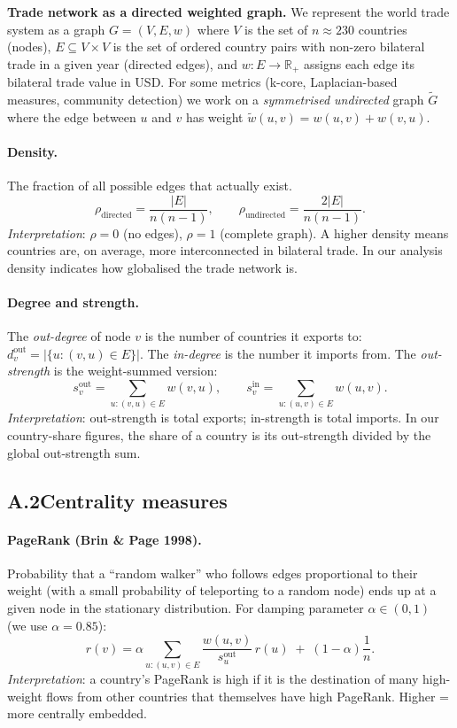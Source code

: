 \documentclass[11pt,a4paper]{article}
\begin{document}
\textbf{Trade network as a directed weighted graph.}
We represent the world trade system as a graph $G = (V, E, w)$ where
$V$ is the set of $n \approx 230$ countries (nodes), $E \subseteq V \times V$
is the set of ordered country pairs with non-zero bilateral trade in a given
year (directed edges), and $w: E \to \mathbb{R}_+$ assigns each edge its
bilateral trade value in USD.
For some metrics (k-core, Laplacian-based measures, community detection)
we work on a \emph{symmetrised undirected} graph $\tilde{G}$ where the
edge between $u$ and $v$ has weight
$\tilde{w}(u,v) = w(u,v) + w(v,u)$.

\paragraph{Density.}
The fraction of all possible edges that actually exist.
\[
\rho_{\text{directed}} = \frac{|E|}{n(n-1)},
\qquad
\rho_{\text{undirected}} = \frac{2|E|}{n(n-1)}.
\]
\emph{Interpretation}: $\rho = 0$ (no edges), $\rho = 1$ (complete graph).
A higher density means countries are, on average, more interconnected in
bilateral trade. In our analysis density indicates how globalised the trade
network is.

\paragraph{Degree and strength.}
The \emph{out-degree} of node $v$ is the number of countries it exports
to: $d_v^{\text{out}} = |\{u : (v,u) \in E\}|$. The \emph{in-degree} is
the number it imports from. The \emph{out-strength} is the
weight-summed version:
\[
s_v^{\text{out}} = \sum_{u : (v,u) \in E} w(v,u),
\qquad
s_v^{\text{in}} = \sum_{u : (u,v) \in E} w(u,v).
\]
\emph{Interpretation}: out-strength is total exports; in-strength is total
imports. In our country-share figures, the share of a country is its
out-strength divided by the global out-strength sum.

\subsection*{A.2\quad Centrality measures}

\paragraph{PageRank (Brin \& Page 1998).}
Probability that a ``random walker'' who follows edges proportional to
their weight (with a small probability of teleporting to a random node)
ends up at a given node in the stationary distribution. For damping
parameter $\alpha \in (0,1)$ (we use $\alpha = 0.85$):
\[
r(v) = \alpha \sum_{u : (u,v) \in E} \frac{w(u,v)}{s_u^{\text{out}}}\, r(u)
\;+\; (1-\alpha)\frac{1}{n}.
\]
\emph{Interpretation}: a country's PageRank is high if it is the
destination of many high-weight flows from other countries that
themselves have high PageRank. Higher = more centrally embedded.
\end{document}
